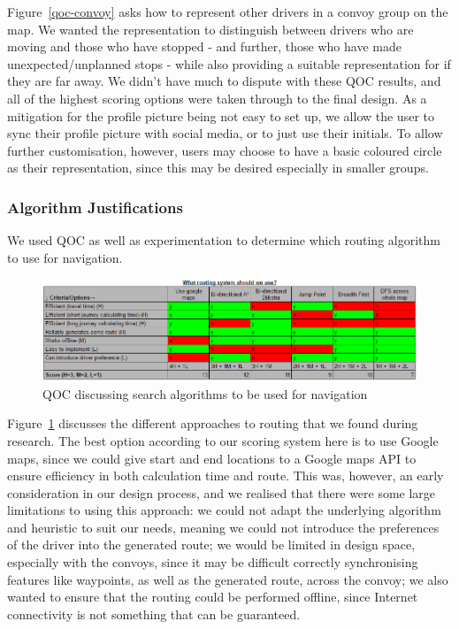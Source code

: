 \documentclass{article}
\begin{document}
Figure~\ref{qoc-convoy} asks how to represent other drivers in a convoy group on the map. We wanted the representation to distinguish between drivers who are moving and those who have stopped - and further, those who have made unexpected/unplanned stops - while also providing a suitable representation for if they are far away. We didn't have much to dispute with these QOC results, and all of the highest scoring options were taken through to the final design. As a mitigation for the profile picture being not easy to set up, we allow the user to sync their profile picture with social media, or to just use their initials. To allow further customisation, however, users may choose to have a basic coloured circle as their representation, since this may be desired especially in smaller groups.

\subsubsection{Algorithm Justifications}\label{sssec:nav-design-alg}
We used QOC as well as experimentation to determine which routing algorithm to use for navigation.

\begin{figure}[H]
  \centering
  \includegraphics[width=\linewidth]{qoc-nav-routing}
  \caption{QOC discussing search algorithms to be used for navigation}\label{qoc-nav-routing}
\end{figure}

Figure~\ref{qoc-nav-routing} discusses the different approaches to routing that we found during research. The best option according to our scoring system here is to use Google maps, since we could give start and end locations to a Google maps API to ensure efficiency in both calculation time and route. This was, however, an early consideration in our design process, and we realised that there were some large limitations to using this approach: we could not adapt the underlying algorithm and heuristic to suit our needs, meaning we could not introduce the preferences of the driver into the generated route; we would be limited in design space, especially with the convoys, since it may be difficult correctly synchronising features like waypoints, as well as the generated route, across the convoy; we also wanted to ensure that the routing could be performed offline, since Internet connectivity is not something that can be guaranteed.
\end{document}
